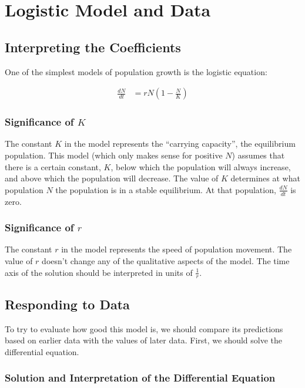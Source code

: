 \documentclass{article}
\begin{document}
\section{Logistic Model and Data}

\subsection{Interpreting the Coefficients}

One of the simplest models of population growth is the logistic equation:

\begin{align}
	\frac{dN}{dt} & = r N (1 - \frac{N}{K})
\end{align}

\subsubsection{Significance of $K$}

The constant $K$ in the model represents the ``carrying capacity'',
	the equilibrium population.
This model (which only makes sense for positive $N$) assumes that there
	is a certain constant, $K$, below which the population will always
	increase, and above which the population will decrease.
The value of $K$ determines at what population $N$ the population
	is in a stable equilibrium.
At that population, $\frac{dN}{dt}$ is zero.

\subsubsection{Significance of $r$}

The constant $r$ in the model represents the speed of population movement.
The value of $r$ doesn't change any of the qualitative aspects of the model.
The time axis of the solution should be interpreted in units of $\frac{1}{r}$.


\subsection{Responding to Data}

To try to evaluate how good this model is, we should compare its
	predictions based on earlier data with the values of later data.
First, we should solve the differential equation.

\subsubsection{Solution and Interpretation of the Differential Equation}
\end{document}

